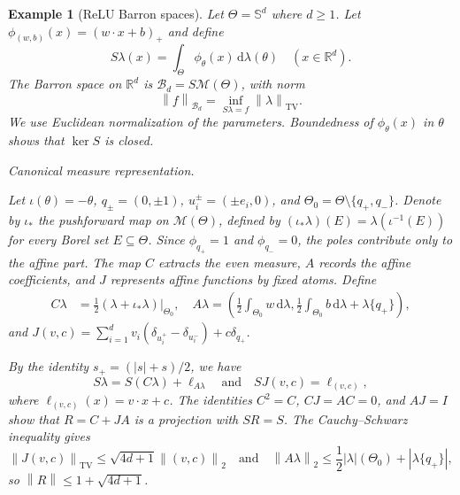 \documentclass[11pt,leqno]{amsart}
\theoremstyle{compact}
\numberwithin{equation}{section}
\theoremstyle{compactremark}
\newtheorem{example}[theorem]{Example}
\theoremstyle{compact}
\newcommand{\1}{\mathbbm{1}}
\newcommand{\rmd}{\mathrm{d}}
\newcommand{\R}{\mathbb{R}}
\newcommand{\norm}[1]{\left\|#1\right\|}
\newcommand{\abs}[1]{\left|#1\right|}
\begin{document}
\begin{example}[ReLU Barron spaces]\label{ex:barron}
Let $\Theta=\mathbb S^d$ where $d\geq1$. Let $\phi_{(w,b)}(x)=(w\cdot x+b)_+$ and define
\[
S\lambda(x)=\int_\Theta\phi_\theta(x)\,\rmd\lambda(\theta)\quad(x\in\R^d).
\]
The Barron space on $\R^d$ is $\mathcal B_d=S\mathcal M(\Theta)$, with norm
\[
\norm{f}_{\mathcal B_d}=\inf_{S\lambda=f}\norm{\lambda}_{\mathrm{TV}}.
\]
We use Euclidean normalization of the parameters. Boundedness of $\phi_\theta(x)$ in $\theta$ shows that $\ker S$ is closed.

\textit{Canonical measure representation.}
\begin{samepage}
Let $\iota(\theta)=-\theta$, $q_\pm=(0,\pm1)$, $u_i^\pm=(\pm e_i,0)$, and $\Theta_0=\Theta\setminus\{q_+,q_-\}$. Denote by $\iota_*$ the pushforward map on $\mathcal M(\Theta)$, defined by $(\iota_*\lambda)(E)=\lambda(\iota^{-1}(E))$ for every Borel set $E\subseteq\Theta$. Since $\phi_{q_+}=1$ and $\phi_{q_-}=0$, the poles contribute only to the affine part. The map $C$ extracts the even measure, $A$ records the affine coefficients, and $J$ represents affine functions by fixed atoms. Define
\begin{align*}
C\lambda&=\frac{1}{2}(\lambda+\iota_*\lambda)|_{\Theta_0},
\quad A\lambda=\left(\frac{1}{2}\int_{\Theta_0}w\,\rmd\lambda,
\frac{1}{2}\int_{\Theta_0}b\,\rmd\lambda+\lambda\{q_+\}\right),
\end{align*}
and $J(v,c)=\sum_{i=1}^dv_i(\delta_{u_i^+}-\delta_{u_i^-})+c\delta_{q_+}$.
\par
\end{samepage}
By the identity $s_+=(\abs{s}+s)/2$, we have
\[
S\lambda=S(C\lambda)+\ell_{A\lambda}\quad\text{and}\quad SJ(v,c)=\ell_{(v,c)},
\]
where $\ell_{(v,c)}(x)=v\cdot x+c$. The identities $C^2=C$, $CJ=AC=0$, and $AJ=I$ show that $R=C+JA$ is a projection with $SR=S$. The Cauchy--Schwarz inequality gives
\[
\norm{J(v,c)}_{\mathrm{TV}}\leq\sqrt{4d+1}\norm{(v,c)}_2\quad\text{and}\quad
\norm{A\lambda}_2\leq\frac{1}{2}\abs{\lambda}(\Theta_0)+\abs{\lambda\{q_+\}},
\]
so $\norm{R}\leq1+\sqrt{4d+1}$.


\end{example}
\end{document}

